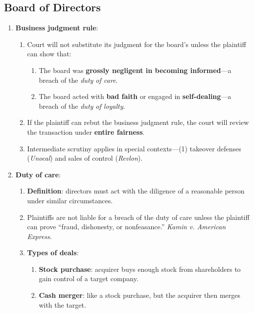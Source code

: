 \newpage

\subsection{Board of Directors}

\begin{enumerate}
    \item \textbf{Business judgment rule}:
    \begin{enumerate}
        \item Court will not substitute its judgment for the board's unless 
        the plaintiff can show that:
        \begin{enumerate}
             \item The board was \textbf{grossly negligent in becoming 
             informed}---a breach of the \emph{duty of care}.
             \item The board acted with \textbf{bad faith} or engaged in 
             \textbf{self-dealing}---a breach of the \emph{duty of loyalty}.
        \end{enumerate}
        \item If the plaintiff can rebut the business judgment rule, the court 
        will review the transaction under \textbf{entire fairness}.
        \item Intermediate scrutiny applies in special contexts---(1) takeover 
        defenses (\emph{Unocal}) and sales of control (\emph{Revlon}).
    \end{enumerate}
    \item \textbf{Duty of care}:
    \begin{enumerate}
        \item \textbf{Definition}: directors must act with the diligence of a 
        reasonable person under similar circumstances.
        \item Plaintiffs are not liable for a breach of the duty of care 
        unless the plaintiff can prove ``fraud, dishonesty, or nonfeasance.'' 
        \emph{Kamin v. American Express}. %
        \item \textbf{Types of deals}:
        \begin{enumerate}
            \item \textbf{Stock purchase}: acquirer buys enough stock from 
            shareholders to gain control of a target company.
            \item \textbf{Cash merger}: like a stock purchase, but the 
            acquirer then merges with the target. 

\end{enumerate}
\end{enumerate}
\end{enumerate}
